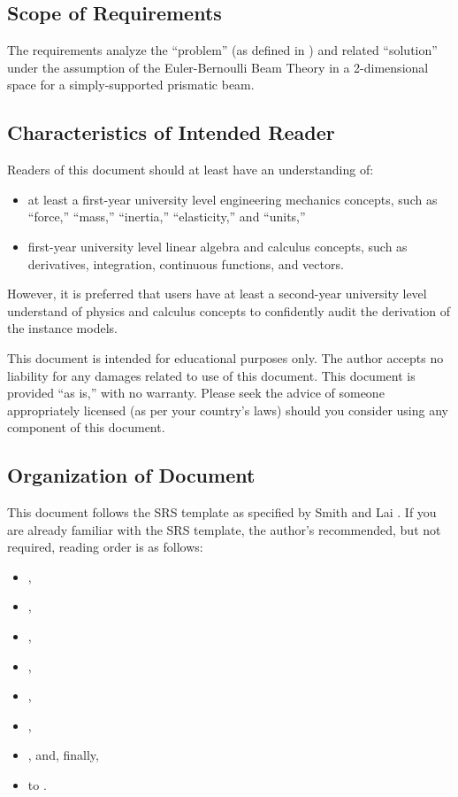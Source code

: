 \documentclass[12pt]{article}
\begin{document}
\subsection{Scope of Requirements}
\label{ssec_scope}

The requirements analyze the ``problem'' (as defined in ) and
related ``solution'' under the assumption of the Euler-Bernoulli Beam Theory
\cite{EulerBernoulliWiki} in a 2-dimensional space for a simply-supported
prismatic beam.

\subsection{Characteristics of Intended Reader}
\label{sec_IntendedReader}

Readers of this document should at least have an understanding of:
\begin{itemize}
    \item at least a first-year university level engineering mechanics concepts,
          such as ``force,'' ``mass,'' ``inertia,'' ``elasticity,'' and
          ``units,''
    \item first-year university level linear algebra and calculus concepts, such
          as derivatives, integration, continuous functions, and vectors.
\end{itemize}

However, it is preferred that users have at least a second-year university level
understand of physics and calculus concepts to confidently audit the derivation
of the instance models.

This document is intended for educational purposes only. The author accepts no
liability for any damages related to use of this document. This document is
provided ``as is,'' with no warranty. Please seek the advice of someone
appropriately licensed (as per your country's laws) should you consider using
any component of this document.

\subsection{Organization of Document}

This document follows the SRS template as specified by Smith and Lai
\cite{SmithAndLai2005}. If you are already familiar with the SRS template, the
author's recommended, but not required, reading order is as follows:

\begin{itemize}
    \item {},
    \item {},
    \item {},
    \item {},
    \item {},
    \item {},
    \item {}, and, finally,
    \item {} to .
\end{itemize}
\end{document}

